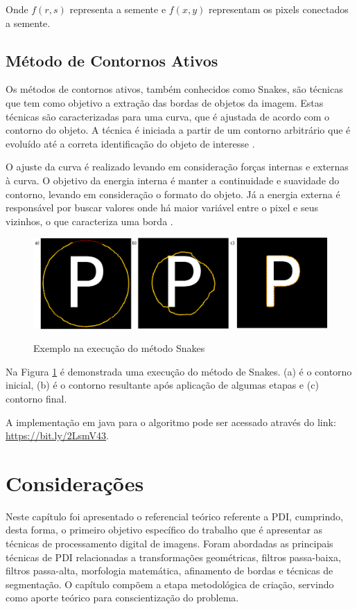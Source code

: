 \documentclass[
	12pt,				%
	oneside,			%
	a4paper,			%
	english,			%
	french,				%
	spanish,			%
	brazil,				%
	]{abntex2}
\begin{document}
Onde \(f(r,s)\) representa a semente e \(f(x, y)\) representam os pixels conectados a semente.
    
\subsection{Método de Contornos Ativos}     

Os métodos de contornos ativos, também conhecidos como Snakes, são técnicas que tem como objetivo a extração das bordas de objetos da imagem. Estas técnicas são caracterizadas para uma curva, que é ajustada de acordo com o contorno do objeto. A técnica é iniciada a partir de um contorno arbitrário que é evoluído até a correta identificação do objeto de interesse \cite{conciAzevedoLeta:2008}.

O ajuste da curva é realizado levando em consideração forças internas e externas à curva. O objetivo da energia interna é manter a continuidade e suavidade do contorno, levando em consideração o formato do objeto. Já a energia externa é responsável por buscar valores onde há maior variável entre o pixel e seus vizinhos, o que caracteriza uma borda \cite{kass:1988}.

\begin{figure}[ht]
\centering
\caption{Exemplo na execução do método Snakes}
\includegraphics[width=1\textwidth]{imagens/snake.png}
\sourceAuthor
\label{fig:snake}
\end{figure}

Na Figura \ref{fig:snake} é demonstrada uma execução do método de Snakes. (a) é o contorno inicial, (b) é o contorno resultante após aplicação de algumas etapas e (c) contorno final.

A implementação em java para o algoritmo pode ser acessado através do link: \url{https://bit.ly/2LsmV43}.

\section{Considerações}

Neste capítulo foi apresentado o referencial teórico referente a PDI, cumprindo, desta forma, o primeiro objetivo específico do trabalho que é apresentar as técnicas de processamento digital de imagens. Foram abordadas as principais técnicas de PDI relacionadas a transformações geométricas, filtros passa-baixa, filtros passa-alta, morfologia matemática, afinamento de bordas e técnicas de segmentação. O capítulo compõem a etapa metodológica de criação, servindo como aporte teórico para conscientização do problema.
\end{document}

